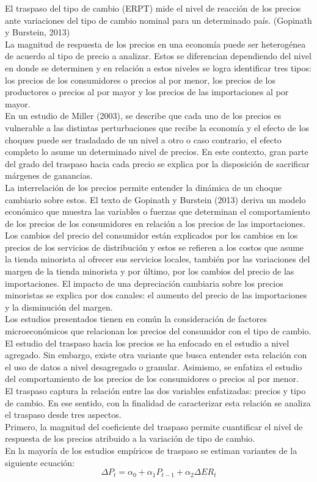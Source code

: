 \documentclass[12pt,a4paper,pdflatex]{article}
\begin{document}
El traspaso del tipo de cambio (ERPT) mide el nivel de reacción de los precios ante variaciones del tipo de cambio nominal para un determinado país. (Gopinath y Burstein, 2013) \\
La magnitud de respuesta de los precios en una economía puede ser heterogénea de acuerdo al tipo de precio a analizar. Estos se diferencian dependiendo del nivel en donde se determinen y en relación a estos niveles se logra identificar tres tipos: los precios de los consumidores o precios al por menor, los precios de los productores o precios al por mayor y los precios de las importaciones al por mayor.\\
En un estudio de Miller (2003), se describe que cada uno de los precios es vulnerable a las distintas perturbaciones que recibe la economía y el efecto de los choques puede ser trasladado de un nivel a otro o caso contrario, el efecto completo lo asume un determinado nivel de precios.  En este contexto, gran parte del grado del traspaso hacia cada precio se explica por la disposición de sacrificar márgenes de ganancias.\\
La interrelación de los precios permite entender la dinámica de un choque cambiario sobre estos. El texto de Gopinath y Burstein (2013) deriva un modelo económico que muestra las variables o fuerzas que determinan el comportamiento de los precios de los consumidores en relación a los precios de las importaciones. Los cambios del precio del consumidor están explicados por los cambios en los precios de los servicios de distribución y estos se refieren a los costos que asume la tienda minorista al ofrecer sus servicios locales, también por las variaciones del margen de la tienda minorista y por último, por los cambios del precio de las importaciones. El impacto de una depreciación cambiaria sobre los precios minoristas se explica por dos canales: el aumento del precio de las importaciones y la disminución del margen.\\
Los estudios presentados tienen en común la consideración de factores microeconómicos que relacionan los precios del consumidor con el tipo de cambio. El estudio del traspaso hacia los precios se ha enfocado en el estudio a nivel agregado. Sin embargo, existe otra variante que busca entender esta relación con el uso de datos a nivel desagregado o granular. Asimismo, se enfatiza el estudio del comportamiento de los precios de los consumidores o precios al por menor. \\
El traspaso captura la relación entre las dos variables enfatizadas: precios y tipo de cambio. En ese sentido, con la finalidad de caracterizar esta relación se analiza el traspaso desde tres aspectos. \\
Primero, la magnitud del coeficiente del traspaso permite cuantificar el nivel de respuesta de los precios atribuido a la variación de tipo de cambio. \\
En la mayoría de los estudios empíricos de traspaso se estiman variantes de la siguiente ecuación:
\begin{equation}
  \Delta P_{t} = \alpha_{0} +\alpha_{1}P_{t-1} +\alpha_{2}\Delta ER_{t}
\end{equation}
\end{document}
